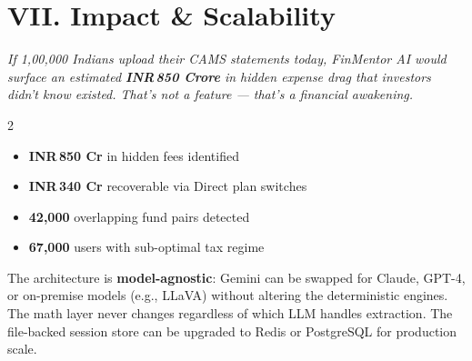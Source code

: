 \documentclass[9pt,a4paper]{article}
\newcommand{\rupee}{INR\,}
\begin{document}
\section{VII. Impact \& Scalability}

\begin{tcolorbox}[colback=action!5!white,colframe=action,boxsep=1pt,left=4pt,right=4pt,top=2pt,bottom=2pt]
\small \textit{If 1,00,000 Indians upload their CAMS statements today, FinMentor AI would surface an estimated \textbf{{\rupee}850 Crore} in hidden expense drag that investors didn't know existed. That's not a feature --- that's a financial awakening.}
\end{tcolorbox}

\vspace{-0.3em}
\begin{multicols}{2}
\begin{itemize}[leftmargin=*,nosep]
    \item \textbf{{\rupee}850 Cr} in hidden fees identified
    \item \textbf{{\rupee}340 Cr} recoverable via Direct plan switches
    \item \textbf{42,000} overlapping fund pairs detected
    \item \textbf{67,000} users with sub-optimal tax regime
\end{itemize}
\end{multicols}

\vspace{0.3em}
\small The architecture is \textbf{model-agnostic}: Gemini can be swapped for Claude, GPT-4, or on-premise models (e.g., LLaVA) without altering the deterministic engines. The math layer never changes regardless of which LLM handles extraction. The file-backed session store can be upgraded to Redis or PostgreSQL for production scale.
\end{document}

